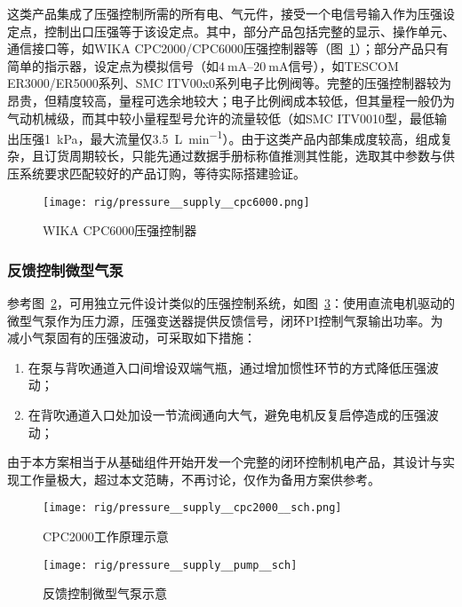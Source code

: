这类产品集成了压强控制所需的所有电、气元件，接受一个电信号输入作为压强设定点，控制出口压强等于该设定点。其中，部分产品包括完整的显示、操作单元、通信接口等，如WIKA CPC2000/CPC6000压强控制器等（图~\ref{fig:rig-pressure-supply-cpc6000}）；部分产品只有简单的指示器，设定点为模拟信号（如$\SIrange{4}{20}{\mA}$信号），如TESCOM ER3000/ER5000系列、SMC ITV00x0系列电子比例阀等。完整的压强控制器较为昂贵，但精度较高，量程可选余地较大；电子比例阀成本较低，但其量程一般仍为气动机械级，而其中较小量程型号允许的流量较低（如SMC ITV0010型，最低输出压强\SI{1}{\kPa}，最大流量仅\SI{3.5}{\L\per\minute}）。由于这类产品内部集成度较高，组成复杂，且订货周期较长，只能先通过数据手册标称值推测其性能，选取其中参数与供压系统要求匹配较好的产品订购，等待实际搭建验证。

\begin{figure}[tbh]
\centering
\texttt{[image: rig/pressure\_\_supply\_\_cpc6000.png]}
\caption{WIKA CPC6000压强控制器}
\label{fig:rig-pressure-supply-cpc6000}
\end{figure}

\subsubsection{反馈控制微型气泵}\label{sec:rig-pressure-supply-pump}

参考图~\ref{fig:rig-pressure-supply-cpc2000-sch}，可用独立元件设计类似的压强控制系统，如图~\ref{fig:rig-pressure-supply-pump-sch}：使用直流电机驱动的微型气泵作为压力源，压强变送器提供反馈信号，闭环PI控制气泵输出功率。为减小气泵固有的压强波动，可采取如下措施：

\begin{enumerate}
  \item 在泵与背吹通道入口间增设双端气瓶，通过增加惯性环节的方式降低压强波动；
  \item 在背吹通道入口处加设一节流阀通向大气，避免电机反复启停造成的压强波动；
\end{enumerate}

由于本方案相当于从基础组件开始开发一个完整的闭环控制机电产品，其设计与实现工作量极大，超过本文范畴，不再讨论，仅作为备用方案供参考。

\begin{figure}[tbh]
\centering
\texttt{[image: rig/pressure\_\_supply\_\_cpc2000\_\_sch.png]}
\caption{CPC2000工作原理示意}
\label{fig:rig-pressure-supply-cpc2000-sch}
\end{figure}

\begin{figure}[p]
\centering
\texttt{[image: rig/pressure\_\_supply\_\_pump\_\_sch]}
\caption{反馈控制微型气泵示意}
\label{fig:rig-pressure-supply-pump-sch}
\end{figure}

